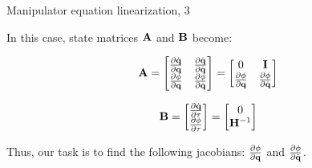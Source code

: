 \documentclass{beamer}
\begin{document}
\begin{frame}{Manipulator equation linearization, 3}
\begin{flushleft}

In this case, state matrices $\mathbf{A}$ and $\mathbf{B}$ become:


\begin{equation}
	\mathbf{A} = 
	\begin{bmatrix}
		\frac{\partial \dot{\mathbf{q}}}{\partial \mathbf{q}}  & 
		\frac{\partial \dot{\mathbf{q}}}{\partial \dot{\mathbf{q}}}
		 \\
		 \frac{\partial \phi}{\partial \mathbf{q}}  & 
		 \frac{\partial \phi}{\partial \dot{\mathbf{q}}}
	\end{bmatrix}
=
	\begin{bmatrix}
	0 & \mathbf{I}
	\\
	\frac{\partial \phi}{\partial \mathbf{q}}  & 
	\frac{\partial \phi}{\partial \dot{\mathbf{q}}}
\end{bmatrix}
\end{equation}


\begin{equation}
	\mathbf{B} = 
	\begin{bmatrix}
		\frac{\partial \dot{\mathbf{q}}}{\partial \tau} 
		\\
		\frac{\partial \phi}{\partial \tau} 
	\end{bmatrix}
	=
	\begin{bmatrix}
		0
		\\
		\mathbf{H}^{-1}
	\end{bmatrix}
\end{equation}

Thus, our task is to find the following jacobians: $\frac{\partial \phi}{\partial \mathbf{q}}$ and $\frac{\partial \phi}{\partial \dot{\mathbf{q}}}$.

\end{flushleft}
\end{frame}
\end{document}
